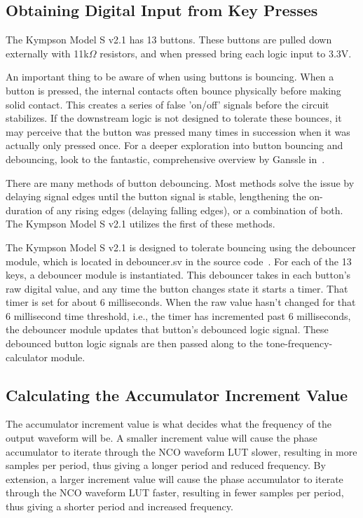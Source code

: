 \documentclass[conference]{IEEEtran}
\begin{document}
\subsection{Obtaining Digital Input from Key Presses}
The Kympson Model S v2.1 has 13 buttons. These buttons are pulled down externally with 11k$\Omega$ resistors, and when pressed bring each logic input to 3.3V.

An important thing to be aware of when using buttons is bouncing. When a button is pressed, the internal contacts often bounce physically before making solid contact. This creates a series of false 'on/off' signals before the circuit stabilizes. If the downstream logic is not designed to tolerate these bounces, it may perceive that the button was pressed many times in succession when it was actually only pressed once. For a deeper exploration into button bouncing and debouncing, look to the fantastic, comprehensive overview by Ganssle in~\cite{ganssle2004guide}.



There are many methods of button debouncing. Most methods solve the issue by delaying signal edges until the button signal is stable, lengthening the on-duration of any rising edges (delaying falling edges), or a combination of both. The Kympson Model S v2.1 utilizes the first of these methods.  

The Kympson Model S v2.1 is designed to tolerate bouncing using the debouncer module, which is located in debouncer.sv in the source code~\cite{github-release}. For each of the 13 keys, a debouncer module is instantiated. This debouncer takes in each button's raw digital value, and any time the button changes state it starts a timer. That timer is set for about 6 milliseconds. When the raw value hasn't changed for that 6 millisecond time threshold, i.e., the timer has incremented past 6 milliseconds, the debouncer module updates that button's debounced logic signal. These debounced button logic signals are then passed along to the tone-frequency-calculator module.

\subsection{Calculating the Accumulator Increment Value}
The accumulator increment value is what decides what the frequency of the output waveform will be. A smaller increment value will cause the phase accumulator to iterate through the NCO waveform LUT slower, resulting in more samples per period, thus giving a longer period and reduced frequency. By extension, a larger increment value will cause the phase accumulator to iterate through the NCO waveform LUT faster, resulting in fewer samples per period, thus giving a shorter period and increased frequency. 
\end{document}
